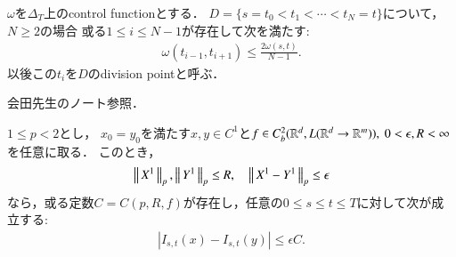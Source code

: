 	\begin{screen}
		\begin{lem}\label{lem:control_function_min}
			$\omega$を$\Delta_T$上のcontrol functionとする．
			$D = \{s = t_0 < t_1 < \cdots < t_N= t\}$について，$N \geq 2$の場合
			或る$1 \leq i \leq N-1$が存在して次を満たす:
			\begin{align}
				\omega(t_{i-1},t_{i+1})
				\leq \frac{2 \omega(s,t)}{N-1}.
			\end{align}
			以後この$t_i$を$D$のdivision pointと呼ぶ．
		\end{lem}
	\end{screen}
	
	\begin{prf}
		会田先生のノート参照．
		\QED
	\end{prf}
	
	\begin{screen}
		\begin{thm}\label{thm:continuity_theorem_1}
			$1 \leq p < 2$とし，
			$x_0 = y_0$を満たす$x,y \in C^1$と$f \in C^2_b(\mathbb{R}^d,L(\mathbb{R}^d \rightarrow \mathbb{R}^m)),\ 0 < \epsilon, R < \infty$を任意に取る．
			このとき，
			\begin{align}
				\left\|\, X^1\, \right\|_{p},\left\|\, Y^1\, \right\|_{p} \leq R,
				\quad \left\|\, X^1 - Y^1\, \right\|_{p} \leq \epsilon
			\end{align}
			なら，或る定数$C = C(p,R,f)$が存在し，任意の$0 \leq s \leq t \leq T$に対して次が成立する:
			\begin{align}
				\left| I_{s,t}(x) - I_{s,t}(y) \right| \leq \epsilon C.
			\end{align}
		\end{thm}
	\end{screen}
	
